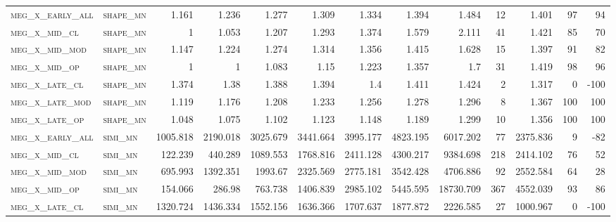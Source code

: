 \begin{landscape}
\begin{center}
\begin{footnotesize}
\begin{longtable}{llrrrrrrrr|rrr}
\textsc{meg\_x\_early\_all} & \textsc{shape\_mn }   & 1.161    & 1.236    & 1.277    & 1.309    & 1.334    & 1.394    & 1.484     & 12     & 1.401         & 97            & 94              \\
\textsc{meg\_x\_mid\_cl   } & \textsc{shape\_mn }   & 1        & 1.053    & 1.207    & 1.293    & 1.374    & 1.579    & 2.111     & 41     & 1.421         & 85            & 70              \\
\textsc{meg\_x\_mid\_mod  } & \textsc{shape\_mn }   & 1.147    & 1.224    & 1.274    & 1.314    & 1.356    & 1.415    & 1.628     & 15     & 1.397         & 91            & 82              \\
\textsc{meg\_x\_mid\_op   } & \textsc{shape\_mn }   & 1        & 1        & 1.083    & 1.15     & 1.223    & 1.357    & 1.7       & 31     & 1.419         & 98            & 96              \\
\textsc{meg\_x\_late\_cl  } & \textsc{shape\_mn }   & 1.374    & 1.38     & 1.388    & 1.394    & 1.4      & 1.411    & 1.424     & 2      & 1.317         & 0             & -100            \\
\textsc{meg\_x\_late\_mod } & \textsc{shape\_mn }   & 1.119    & 1.176    & 1.208    & 1.233    & 1.256    & 1.278    & 1.296     & 8      & 1.367         & 100           & 100             \\
\textsc{meg\_x\_late\_op  } & \textsc{shape\_mn }   & 1.048    & 1.075    & 1.102    & 1.123    & 1.148    & 1.189    & 1.299     & 10     & 1.356         & 100           & 100             \\
\textsc{meg\_x\_early\_all} & \textsc{simi\_mn  }   & 1005.818 & 2190.018 & 3025.679 & 3441.664 & 3995.177 & 4823.195 & 6017.202  & 77     & 2375.836      & 9             & -82             \\
\textsc{meg\_x\_mid\_cl   } & \textsc{simi\_mn  }   & 122.239  & 440.289  & 1089.553 & 1768.816 & 2411.128 & 4300.217 & 9384.698  & 218    & 2414.102      & 76            & 52              \\
\textsc{meg\_x\_mid\_mod  } & \textsc{simi\_mn  }   & 695.993  & 1392.351 & 1993.67  & 2325.569 & 2775.181 & 3542.428 & 4706.886  & 92     & 2552.584      & 64            & 28              \\
\textsc{meg\_x\_mid\_op   } & \textsc{simi\_mn  }   & 154.066  & 286.98   & 763.738  & 1406.839 & 2985.102 & 5445.595 & 18730.709 & 367    & 4552.039      & 93            & 86              \\
\textsc{meg\_x\_late\_cl  } & \textsc{simi\_mn  }   & 1320.724 & 1436.334 & 1552.156 & 1636.366 & 1707.637 & 1877.872 & 2226.585  & 27     & 1000.967      & 0             & -100            \\

\end{longtable}
\end{footnotesize}
\end{center}
\end{landscape}

